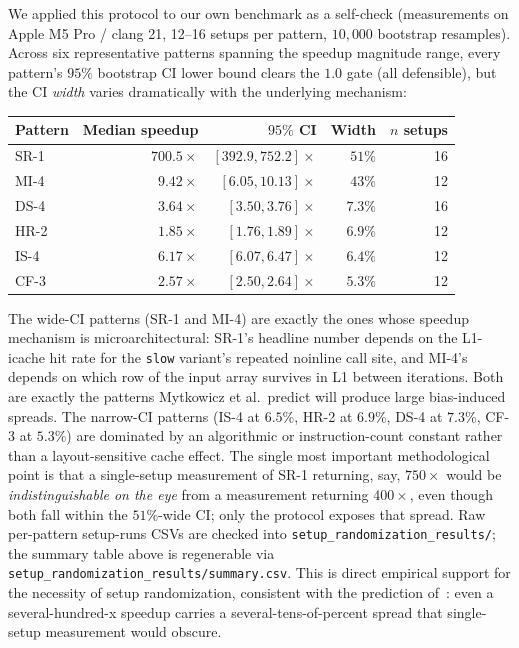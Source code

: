 We applied this protocol to our own benchmark as a self-check (measurements on Apple M5 Pro / clang 21, 12--16 setups per pattern, $10{,}000$ bootstrap resamples). Across six representative patterns spanning the speedup magnitude range, every pattern's $95\%$ bootstrap CI lower bound clears the $1.0$ gate (all defensible), but the CI \emph{width} varies dramatically with the underlying mechanism:

\begin{center}
\begin{tabular}{lrrrr}
\toprule
\textbf{Pattern} & \textbf{Median speedup} & \textbf{$95\%$ CI} & \textbf{Width} & \textbf{$n$ setups} \\
\midrule
SR-1 & $700.5\times$  & $[392.9, 752.2]\times$ & $51\%$ & 16 \\
MI-4 & $9.42\times$   & $[6.05, 10.13]\times$  & $43\%$ & 12 \\
DS-4 & $3.64\times$   & $[3.50, 3.76]\times$   & $7.3\%$ & 16 \\
HR-2 & $1.85\times$   & $[1.76, 1.89]\times$   & $6.9\%$ & 12 \\
IS-4 & $6.17\times$   & $[6.07, 6.47]\times$   & $6.4\%$ & 12 \\
CF-3 & $2.57\times$   & $[2.50, 2.64]\times$   & $5.3\%$ & 12 \\
\bottomrule
\end{tabular}
\end{center}

The wide-CI patterns (SR-1 and MI-4) are exactly the ones whose speedup mechanism is microarchitectural: SR-1's headline number depends on the L1-icache hit rate for the \texttt{slow} variant's repeated noinline call site, and MI-4's depends on which row of the input array survives in L1 between iterations. Both are exactly the patterns Mytkowicz et al.\ predict will produce large bias-induced spreads. The narrow-CI patterns (IS-4 at $6.5\%$, HR-2 at $6.9\%$, DS-4 at $7.3\%$, CF-3 at $5.3\%$) are dominated by an algorithmic or instruction-count constant rather than a layout-sensitive cache effect. The single most important methodological point is that a single-setup measurement of SR-1 returning, say, $750\times$ would be \emph{indistinguishable on the eye} from a measurement returning $400\times$, even though both fall within the $51\%$-wide CI; only the protocol exposes that spread. Raw per-pattern setup-runs CSVs are checked into \texttt{setup\_randomization\_results/}; the summary table above is regenerable via \texttt{setup\_randomization\_results/summary.csv}. This is direct empirical support for the necessity of setup randomization, consistent with the prediction of~\cite{mytkowicz2009producing}: even a several-hundred-x speedup carries a several-tens-of-percent spread that single-setup measurement would obscure.

